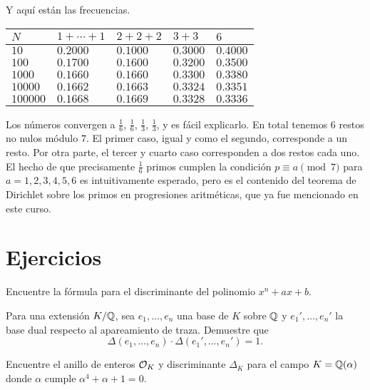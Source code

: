 Y aquí están las frecuencias.

\begin{center}
  \renewcommand{\arraystretch}{1.5}
  \begin{tabular}{lx{2cm}x{2cm}x{2cm}x{2cm}}
    $N$      & $1+\cdots+1$ & $2+2+2$ & $3+3$ & $6$ \tabularnewline
    \hline
    $10$     & $0.2000$ & $0.1000$ & $0.3000$ & $0.4000$ \tabularnewline
    $100$    & $0.1700$ & $0.1600$ & $0.3200$ & $0.3500$ \tabularnewline
    $1000$   & $0.1660$ & $0.1660$ & $0.3300$ & $0.3380$ \tabularnewline
    $10000$  & $0.1662$ & $0.1663$ & $0.3324$ & $0.3351$ \tabularnewline
    $100000$ & $0.1668$ & $0.1669$ & $0.3328$ & $0.3336$ \tabularnewline
  \end{tabular}
\end{center}

Los números convergen a $\frac{1}{6}$, $\frac{1}{6}$, $\frac{1}{3}$,
$\frac{1}{3}$, y es fácil explicarlo. En total tenemos $6$ restos no nulos
módulo $7$. El primer caso, igual y como el segundo, corresponde a un resto.
Por otra parte, el tercer y cuarto caso corresponden a dos restos cada uno.
El hecho de que precisamente $\frac{1}{6}$ primos cumplen la condición
$p \equiv a \pmod{7}$ para $a = 1,2,3,4,5,6$ es intuitivamente esperado, pero
es el contenido del teorema de Dirichlet sobre los primos en progresiones
aritméticas, que ya fue mencionado en este curso.


\pagebreak


\section*{Ejercicios}

\begin{ejercicio}
  Encuentre la fórmula para el discriminante del polinomio $x^n + ax + b$.
\end{ejercicio}

\begin{ejercicio}
  Para una extensión $K/\mathbb{Q}$, sea $e_1,\ldots,e_n$ una base de $K$ sobre $\mathbb{Q}$
  y $e_1', \ldots, e_n'$ la base dual respecto al apareamiento de traza.
  Demuestre que
  $$\Delta (e_1,\ldots,e_n) \cdot \Delta (e_1', \ldots, e_n') = 1.$$
\end{ejercicio}

\begin{ejercicio}
  Encuentre el anillo de enteros $\mathcal{O}_K$ y discriminante $\Delta_K$ para el campo
  $K = \mathbb{Q} (\alpha)$ donde $\alpha$ cumple $\alpha^4 + \alpha + 1 = 0$.
\end{ejercicio}

